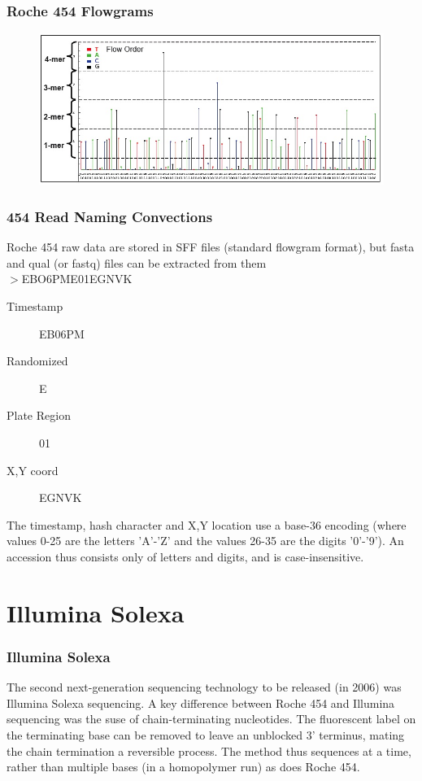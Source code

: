 \documentclass[pdf]{beamer}
\begin{document}
\begin{frame}
  \frametitle{Roche 454 Flowgrams}
  \begin{center}
    \begin{figure}
    \includegraphics[scale=0.35]{Flowgram.jpg}
  \end{figure}
  \end{center}
\end{frame}

\begin{frame}
  \frametitle{454 Read Naming Convections}
Roche 454 raw data are stored in SFF files (standard flowgram format), but fasta and qual (or fastq) files can be extracted from them\\
  $>$EBO6PME01EGNVK
  \begin{description}
  \item[Timestamp] EB06PM
  \item[Randomized ] E
  \item[Plate Region] 01
  \item[X,Y coord] EGNVK
  \end{description}
  The timestamp, hash character and X,Y location use a base-36 encoding (where values 0-25 are the letters 'A'-'Z' and the values 26-35 are the digits '0'-'9'). An accession thus consists only of letters and digits, and is case-insensitive. 
\end{frame}
   

\section{Illumina Solexa}

\begin{frame}
  \frametitle{Illumina Solexa}
  The second next-generation sequencing technology to be released (in 2006) was Illumina Solexa sequencing. A key difference between Roche 454 and Illumina sequencing was the suse of chain-terminating nucleotides. The fluorescent label on the terminating base can be removed to leave an unblocked 3' terminus, mating the chain termination a reversible process. The method thus sequences at a time, rather than multiple bases (in a homopolymer run) as does Roche 454.
\end{frame}
\end{document}
